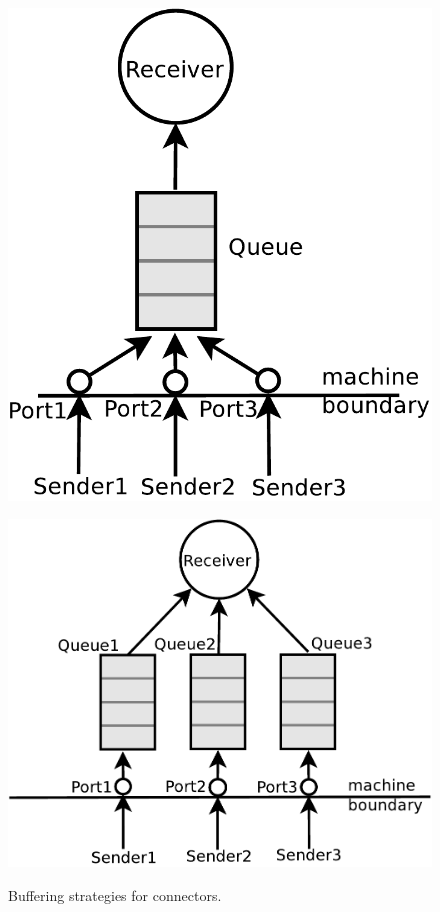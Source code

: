 \vspace{-1mm}
\begin{figure} [htb!]
  \begin{minipage}[b]{0.38\linewidth}
  \centering
  \includegraphics[scale=0.3, trim=10 10 30 10]{images/connector1}
  \end{minipage}
  \begin{minipage}[b]{0.55\linewidth}
  \centering
  \includegraphics[scale=0.3, trim=7 10 40 10]{images/connector2}
  \label{subfig:networkbuffers}
  \end{minipage}
  \caption{Buffering strategies for connectors.}\label{fig:networkbuffers}
\end{figure}
\vspace{-1mm}

